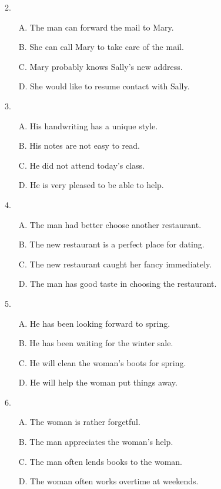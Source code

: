 \documentclass[UTF8,11pt]{ctexart}
\begin{document}
2.


\begin{itemize}[leftmargin=2em,itemsep=.2em,topsep=.4em]\item[A.] The man can forward the mail to Mary.
\item[B.] She can call Mary to take care of the mail.
\item[C.] Mary probably knows Sally’s new address.
\item[D.] She would like to resume contact with Sally.
\end{itemize}

3.


\begin{itemize}[leftmargin=2em,itemsep=.2em,topsep=.4em]\item[A.] His handwriting has a unique style.
\item[B.] His notes are not easy to read.
\item[C.] He did not attend today’s class.
\item[D.] He is very pleased to be able to help.
\end{itemize}

4.


\begin{itemize}[leftmargin=2em,itemsep=.2em,topsep=.4em]\item[A.] The man had better choose another restaurant.
\item[B.] The new restaurant is a perfect place for dating.
\item[C.] The new restaurant caught her fancy immediately.
\item[D.] The man has good taste in choosing the restaurant.
\end{itemize}

5.


\begin{itemize}[leftmargin=2em,itemsep=.2em,topsep=.4em]\item[A.] He has been looking forward to spring.
\item[B.] He has been waiting for the winter sale.
\item[C.] He will clean the woman’s boots for spring.
\item[D.] He will help the woman put things away.
\end{itemize}

6.


\begin{itemize}[leftmargin=2em,itemsep=.2em,topsep=.4em]\item[A.] The woman is rather forgetful.
\item[B.] The man appreciates the woman’s help.
\item[C.] The man often lends books to the woman.
\item[D.] The woman often works overtime at weekends.
\end{itemize}
\end{document}
